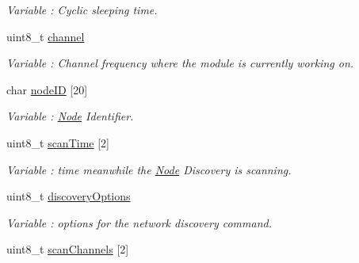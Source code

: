 \begin{DoxyCompactItemize}
\begin{DoxyCompactList}\small\item\em Variable \+: Cyclic sleeping time. \end{DoxyCompactList}\item 
uint8\+\_\+t \hyperlink{class_wasp_x_bee_core_a28592573f397375b74148799137d1d6d}{channel}\hypertarget{class_wasp_x_bee_core_a28592573f397375b74148799137d1d6d}{}\label{class_wasp_x_bee_core_a28592573f397375b74148799137d1d6d}

\begin{DoxyCompactList}\small\item\em Variable \+: Channel frequency where the module is currently working on. \end{DoxyCompactList}\item 
char \hyperlink{class_wasp_x_bee_core_a6ce161100a5f11cf65852b8d13c5fe39}{node\+ID} \mbox{[}20\mbox{]}\hypertarget{class_wasp_x_bee_core_a6ce161100a5f11cf65852b8d13c5fe39}{}\label{class_wasp_x_bee_core_a6ce161100a5f11cf65852b8d13c5fe39}

\begin{DoxyCompactList}\small\item\em Variable \+: \hyperlink{struct_node}{Node} Identifier. \end{DoxyCompactList}\item 
uint8\+\_\+t \hyperlink{class_wasp_x_bee_core_ac06cdaf2c88ef6ad214a2ae6f4645fa2}{scan\+Time} \mbox{[}2\mbox{]}\hypertarget{class_wasp_x_bee_core_ac06cdaf2c88ef6ad214a2ae6f4645fa2}{}\label{class_wasp_x_bee_core_ac06cdaf2c88ef6ad214a2ae6f4645fa2}

\begin{DoxyCompactList}\small\item\em Variable \+: time meanwhile the \hyperlink{struct_node}{Node} Discovery is scanning. \end{DoxyCompactList}\item 
uint8\+\_\+t \hyperlink{class_wasp_x_bee_core_ac08fe8dab29ab194b1bf91dc95d84cc0}{discovery\+Options}\hypertarget{class_wasp_x_bee_core_ac08fe8dab29ab194b1bf91dc95d84cc0}{}\label{class_wasp_x_bee_core_ac08fe8dab29ab194b1bf91dc95d84cc0}

\begin{DoxyCompactList}\small\item\em Variable \+: options for the network discovery command. \end{DoxyCompactList}\item 
uint8\+\_\+t \hyperlink{class_wasp_x_bee_core_a2d91b86ad1c584d374765db0220d2235}{scan\+Channels} \mbox{[}2\mbox{]}\hypertarget{class_wasp_x_bee_core_a2d91b86ad1c584d374765db0220d2235}{}\label{class_wasp_x_bee_core_a2d91b86ad1c584d374765db0220d2235}


\end{DoxyCompactItemize}
